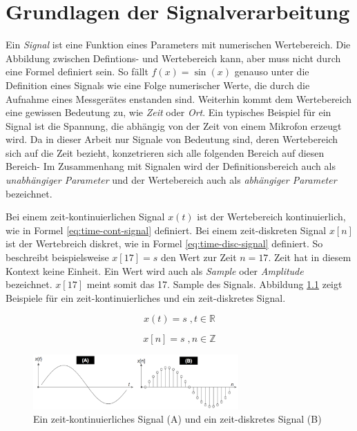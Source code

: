 \chapter{Grundlagen der Signalverarbeitung}

Ein \emph{Signal} ist eine Funktion eines Parameters mit numerischen Wertebereich. Die Abbildung zwischen Defintions- und Wertebereich kann, aber muss nicht durch eine Formel definiert sein. So fällt $f(x) = \sin( x )$ genauso unter die Definition eines Signals wie eine Folge numerischer Werte, die durch die Aufnahme eines Messgerätes enstanden sind. Weiterhin kommt dem Wertebereich eine gewissen Bedeutung zu, wie \emph{Zeit} oder \emph{Ort}. Ein typisches Beispiel für ein Signal ist die Spannung, die abhängig von der Zeit von einem Mikrofon erzeugt wird.  Da in dieser Arbeit nur Signale von Bedeutung sind, deren Wertebereich sich auf die Zeit bezieht, konzetrieren sich alle folgenden Bereich auf diesen Bereich- Im Zusammenhang mit Signalen wird der Definitionsbereich auch als \emph{unabhängiger Parameter} und der Wertebereich auch als \emph{abhängiger Parameter} bezeichnet. \cite[S. 11-12]{dspGuide} \cite[S. 22-23]{dspMichigan}

\medskip

 Bei einem zeit-kontinuierlichen Signal $x( t )$ ist der Wertebereich kontinuierlich, wie in Formel  \ref{eq:time-cont-signal} definiert. Bei einem zeit-diskreten Signal $x[n]$ ist der Wertebreich diskret, wie in Formel \ref{eq:time-disc-signal} definiert. So beschreibt beispielsweise $x[17] = s$ den Wert zur Zeit $n = 17$. \glqq Zeit\grqq{} hat in diesem Kontext keine Einheit. Ein Wert wird auch als \emph{Sample} oder \emph{Amplitude} bezeichnet. $x[17] $ meint somit das 17. Sample des Signals. Abbildung \ref{img:aSignal} zeigt Beispiele für ein zeit-kontinuierliches und ein zeit-diskretes Signal. \cite[S. 22 - 23]{dspMichigan}

 \begin{equation}
x(t) = s \; , t \in \mathbb{R}
\label{eq:time-cont-signal}
\end{equation}


\begin{equation}
x[n] = s \; , n \in \mathbb{Z} 
\label{eq:time-disc-signal}
\end{equation}

\begin{figure}
	\centering
	\includegraphics[width=0.7\textwidth]{bilder/aSignal02.png}
	\caption{Ein zeit-kontinuierliches Signal (A) und ein zeit-diskretes Signal (B)}
	\label{img:aSignal}
\end{figure}

